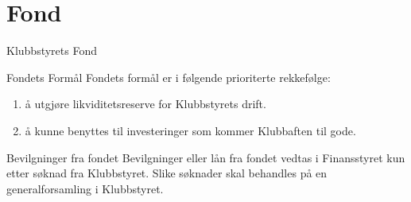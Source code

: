 \chapter{Fond}

\begin{fond}{Klubbstyrets Fond}
    \begin{fondsparagraf}{Fondets Formål}
        Fondets formål er i følgende prioriterte rekkefølge:
        \begin{enumerate}
            \item å utgjøre likviditetsreserve for Klubbstyrets drift.
            \item å kunne benyttes til investeringer som kommer Klubbaften til gode.
        \end{enumerate}
    \end{fondsparagraf}

    \begin{fondsparagraf}{Bevilgninger fra fondet}
        Bevilgninger eller lån fra fondet vedtas i Finansstyret kun etter søknad fra
        Klubbstyret. Slike søknader skal behandles på en generalforsamling i Klubbstyret.
    \end{fondsparagraf}

\end{fond}


